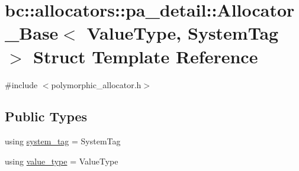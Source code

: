\hypertarget{structbc_1_1allocators_1_1pa__detail_1_1Allocator__Base}{}\section{bc\+:\+:allocators\+:\+:pa\+\_\+detail\+:\+:Allocator\+\_\+\+Base$<$ Value\+Type, System\+Tag $>$ Struct Template Reference}
\label{structbc_1_1allocators_1_1pa__detail_1_1Allocator__Base}


{\ttfamily \#include $<$polymorphic\+\_\+allocator.\+h$>$}

\subsection*{Public Types}
\begin{DoxyCompactItemize}
\item 
using \hyperlink{structbc_1_1allocators_1_1pa__detail_1_1Allocator__Base_ad85cad33901196bc10affe231300c020}{system\+\_\+tag} = System\+Tag
\item 
using \hyperlink{structbc_1_1allocators_1_1pa__detail_1_1Allocator__Base_afb5e955c647a4b6742010e2790398b1c}{value\+\_\+type} = Value\+Type
\end{DoxyCompactItemize}
